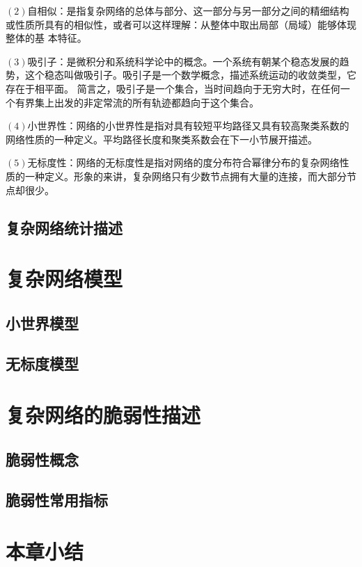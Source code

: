$(2)$自相似：是指复杂网络的总体与部分、这一部分与另一部分之间的精细结构或性质所具有的相似性，或者可以这样理解：从整体中取出局部（局域）能够体现整体的基
本特征。

$(3)$吸引子：是微积分和系统科学论中的概念。一个系统有朝某个稳态发展的趋势，这个稳态叫做吸引子。吸引子是一个数学概念，描述系统运动的收敛类型，它存在于相平面。
简言之，吸引子是一个集合，当时间趋向于无穷大时，在任何一个有界集上出发的非定常流的所有轨迹都趋向于这个集合。

$(4)$小世界性：网络的小世界性是指对具有较短平均路径又具有较高聚类系数的网络性质的一种定义。平均路径长度和聚类系数会在下一小节展开描述。

$(5)$无标度性：网络的无标度性是指对网络的度分布符合幂律分布的复杂网络性质的一种定义。形象的来讲，复杂网络只有少数节点拥有大量的连接，而大部分节点却很少。




\subsection{复杂网络统计描述}
\label{sec:feature}



\section{复杂网络模型}
\label{sec:wind}


\subsection{小世界模型}
\label{sec:windEffects}



\subsection{无标度模型}
\label{sec:windModel}



\section{复杂网络的脆弱性描述}
\label{sec:load}



\subsection{脆弱性概念}
\label{sec:loadEffect}




\subsection{脆弱性常用指标}
\label{sec:loadModel}




\section{本章小结}
\label{sec:sum2}





